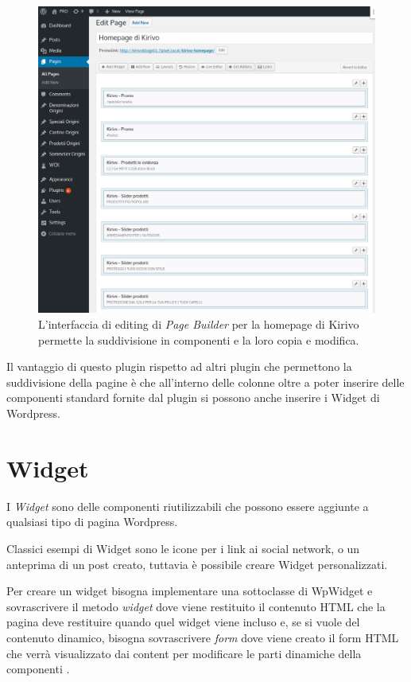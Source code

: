 \begin{figure}
  \includegraphics[width=\textwidth]{figure/pagebuilder.png}
  \caption{L'interfaccia di editing di \emph{Page Builder} per la homepage di Kirivo permette
  la suddivisione in componenti e la loro copia e modifica.}
  \label{fig:wsource}
\end{figure}


Il vantaggio di questo plugin rispetto ad altri plugin che permettono la suddivisione della pagine è che all'interno delle colonne
oltre a poter inserire delle componenti standard fornite dal plugin si possono anche inserire i Widget di Wordpress.

\section{Widget}
I \emph{Widget} sono delle componenti riutilizzabili che possono essere aggiunte a qualsiasi
tipo di pagina Wordpress. 

Classici esempi di Widget sono le icone per i link ai social network, o un anteprima di un post creato, tuttavia è possibile creare Widget
personalizzati.

Per creare un widget bisogna implementare una sottoclasse di WpWidget\cite{WPWID}
e sovrascrivere il metodo \emph{widget} dove viene restituito il contenuto HTML che la pagina deve restituire quando quel widget viene incluso
e, se si vuole del contenuto dinamico, bisogna sovrascrivere \emph{form} dove viene creato il form HTML che verrà visualizzato dai content per modificare le
parti dinamiche della componenti	.

